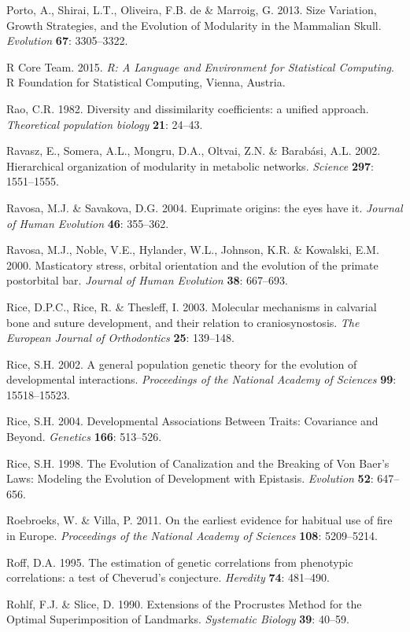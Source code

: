 \documentclass[12pt,twoside]{report}
\begin{document}
Porto, A., Shirai, L.T., Oliveira, F.B. de \& Marroig, G. 2013. Size
Variation, Growth Strategies, and the Evolution of Modularity in the
Mammalian Skull. \emph{Evolution} \textbf{67}: 3305--3322.

R Core Team. 2015. \emph{R: A Language and Environment for Statistical
Computing}. R Foundation for Statistical Computing, Vienna, Austria.

Rao, C.R. 1982. Diversity and dissimilarity coefficients: a unified
approach. \emph{Theoretical population biology} \textbf{21}: 24--43.

Ravasz, E., Somera, A.L., Mongru, D.A., Oltvai, Z.N. \& Barabási, A.L.
2002. Hierarchical organization of modularity in metabolic networks.
\emph{Science} \textbf{297}: 1551--1555.

Ravosa, M.J. \& Savakova, D.G. 2004. Euprimate origins: the eyes have
it. \emph{Journal of Human Evolution} \textbf{46}: 355--362.

Ravosa, M.J., Noble, V.E., Hylander, W.L., Johnson, K.R. \& Kowalski,
E.M. 2000. Masticatory stress, orbital orientation and the evolution of
the primate postorbital bar. \emph{Journal of Human Evolution}
\textbf{38}: 667--693.

Rice, D.P.C., Rice, R. \& Thesleff, I. 2003. Molecular mechanisms in
calvarial bone and suture development, and their relation to
craniosynostosis. \emph{The European Journal of Orthodontics}
\textbf{25}: 139--148.

Rice, S.H. 2002. A general population genetic theory for the evolution
of developmental interactions. \emph{Proceedings of the National Academy
of Sciences} \textbf{99}: 15518--15523.

Rice, S.H. 2004. Developmental Associations Between Traits: Covariance
and Beyond. \emph{Genetics} \textbf{166}: 513--526.

Rice, S.H. 1998. The Evolution of Canalization and the Breaking of Von
Baer's Laws: Modeling the Evolution of Development with Epistasis.
\emph{Evolution} \textbf{52}: 647--656.

Roebroeks, W. \& Villa, P. 2011. On the earliest evidence for habitual
use of fire in Europe. \emph{Proceedings of the National Academy of
Sciences} \textbf{108}: 5209--5214.

Roff, D.A. 1995. The estimation of genetic correlations from phenotypic
correlations: a test of Cheverud's conjecture. \emph{Heredity}
\textbf{74}: 481--490.

Rohlf, F.J. \& Slice, D. 1990. Extensions of the Procrustes Method for
the Optimal Superimposition of Landmarks. \emph{Systematic Biology}
\textbf{39}: 40--59.
\end{document}
